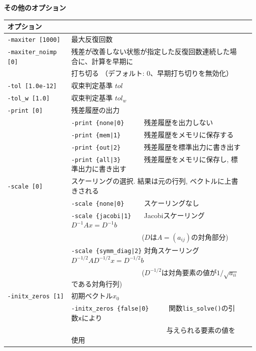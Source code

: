 \documentclass[a4paper]{jarticle}
\begin{document}
{{\begin{minipage}[t]{\textwidth}
\begin{center}
{\bf その他のオプション}\\
\begin{tabular}{l|ll}\hline\hline
オプション &                          \\ \hline
\verb=-maxiter [1000]= & 最大反復回数         \\
\verb=-maxiter_noimp [0]= & 残差が改善しない状態が指定した反復回数連続した場合に、計算を早期に \\
                       & 打ち切る （デフォルト: 0、早期打ち切りを無効化） \\
\verb=-tol [1.0e-12]=  & 収束判定基準 $tol$             \\
\verb=-tol_w [1.0]=    & 収束判定基準 $tol_w$           \\
\verb=-print [0]=      & 残差履歴の出力                 \\
                       & \verb=-print {none|0}     =  残差履歴を出力しない \\
                       & \verb=-print {mem|1}      =  残差履歴をメモリに保存する\\
                       & \verb=-print {out|2}      =  残差履歴を標準出力に書き出す\\
                       & \verb=-print {all|3}      =  残差履歴をメモリに保存し, 標準出力に書き出す\\
\verb=-scale [0]=      & スケーリングの選択. 結果は元の行列, ベクトルに上書きされる \\
                       & \verb=-scale {none|0}     =  スケーリングなし \\ 
                       & \verb=-scale {jacobi|1}   =  Jacobiスケーリング $D^{-1}Ax=D^{-1}b$ \\
                       & \verb=                    =  ($D$は$A=(a_{ij})$の対角部分)\\
                       & \verb=-scale {symm_diag|2}=  対角スケーリング $D^{-1/2}AD^{-1/2}x=D^{-1/2}b$ \\
                       & \verb=                    =  ($D^{-1/2}$は対角要素の値が$1/\sqrt{a_{ii}}$である対角行列) \\ 
\verb=-initx_zeros [1]= & 初期ベクトル$x_{0}$  \\
                       & \verb=-initx_zeros {false|0}     =  関数\verb=lis_solve()=の引数\verb=x=により \\
                       & \verb=                           =  与えられる要素の値を使用 \\

\end{tabular}
\end{center}
\end{minipage}}}
\end{document}
